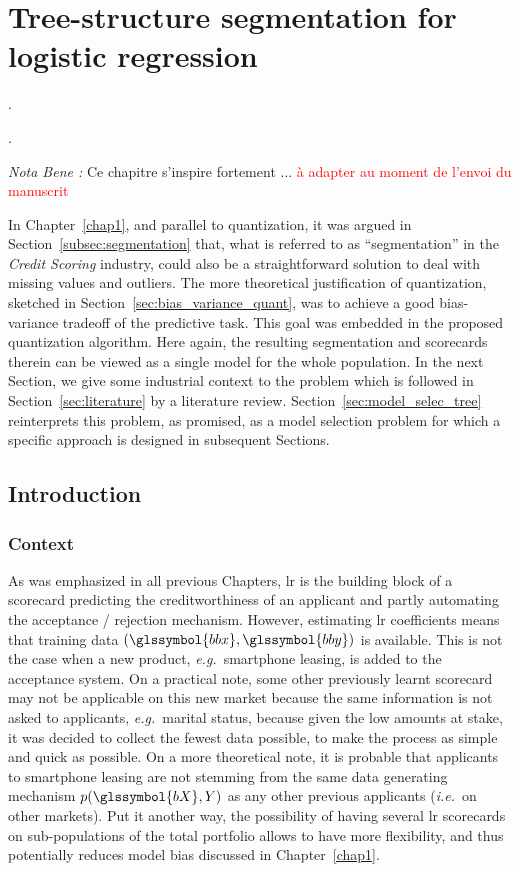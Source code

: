 \chapter{Tree-structure segmentation for logistic regression} \label{chap6}

\epigraph{.}{.}

\minitoc


\textit{Nota Bene :} Ce chapitre s'inspire fortement ... \textcolor{red}{à adapter au moment de l'envoi du manuscrit}

\bigskip


In Chapter~\ref{chap1}, and parallel to quantization, it was argued in Section~\ref{subsec:segmentation} that, what is referred to as ``segmentation'' in the \textit{Credit Scoring} industry, could also be a straightforward solution to deal with missing values and outliers. The more theoretical justification of quantization, sketched in Section~\ref{sec:bias_variance_quant}, was to achieve a good bias-variance tradeoff of the predictive task. This goal was embedded in the proposed quantization algorithm. Here again, the resulting segmentation and scorecards therein can be viewed as a single model for the whole population. In the next Section, we give some industrial context to the problem which is followed in Section~\ref{sec:literature} by a literature review. Section~\ref{sec:model_selec_tree} reinterprets this problem, as promised, as a model selection problem for which a specific approach is designed in subsequent Sections.


\section{Introduction}

\subsection{Context}

As was emphasized in all previous Chapters, \gls{lr} is the building block of a scorecard predicting the creditworthiness of an applicant and partly automating the acceptance / rejection mechanism. However, estimating \gls{lr} coefficients means that training data $(\glssymbol{bbx},\glssymbol{bby})$ is available. This is not the case when a new product, \textit{e.g.}\ smartphone leasing, is added to the acceptance system. On a practical note, some other previously learnt scorecard may not be applicable on this new market because the same information is not asked to applicants, \textit{e.g.}\ marital status, because given the low amounts at stake, it was decided to collect the fewest data possible, to make the process as simple and quick as possible. On a more theoretical note, it is probable that applicants to smartphone leasing are not stemming from the same data generating mechanism $p(\glssymbol{bX},Y)$ as any other previous applicants (\textit{i.e.}\ on other markets). Put it another way, the possibility of having several \gls{lr} scorecards on sub-populations of the total portfolio allows to have more flexibility, and thus potentially reduces model bias discussed in Chapter~\ref{chap1}.

